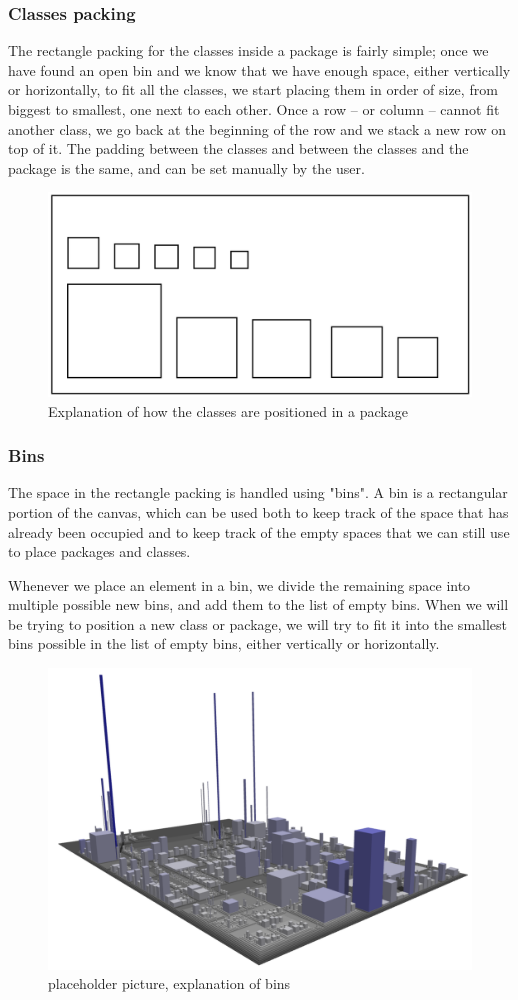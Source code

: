 \documentclass[]{usiinfbachelorproject}
\begin{document}
\subsubsection{Classes packing} \label{Classes packing}
The rectangle packing for the classes inside a package is fairly simple; once we have found an open bin and we know that we have enough space, either vertically or horizontally, to fit all the classes, we start placing them in order of size, from biggest to smallest, one next to each other. Once a row -- or column -- cannot fit another class, we go back at the beginning of the row and we stack a new row on top of it. The padding between the classes and between the classes and the package is the same, and can be set manually by the user.

\begin{figure} [H]
\centering
\includegraphics[width=.5\textwidth]{pictures/classPacking.png}
\caption{Explanation of how the classes are positioned in a package}
\label{fig:flow}
\end{figure}


\subsubsection{Bins} \label{Bins}
The space in the rectangle packing is handled using "bins". A bin is a rectangular portion of the canvas, which can be used both to keep track of the space that has already been occupied and to keep track of the empty spaces that we can still use to place packages and classes.

Whenever we place an element in a bin, we divide the remaining space into multiple possible new bins, and add them to the list of empty bins. When we will be trying to position a new class or package, we will try to fit it into the smallest bins possible in the list of empty bins, either vertically or horizontally.

\begin{figure} [H]
\centering
\includegraphics[width=.5\textwidth]{pictures/example.png}
\caption{placeholder picture, explanation of bins}
\label{fig:flow}
\end{figure}
\end{document}
